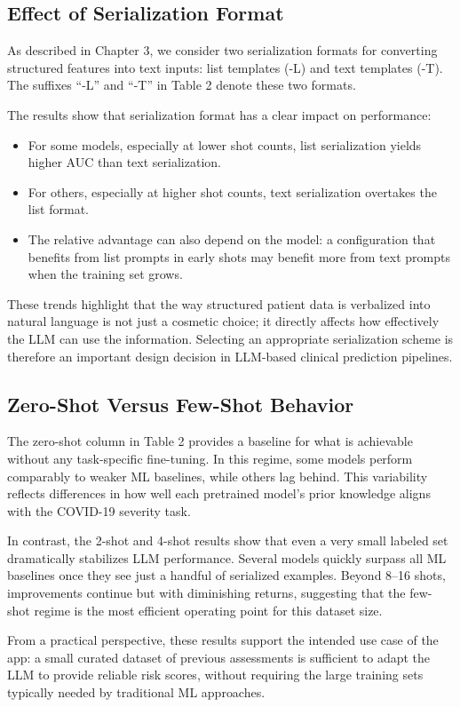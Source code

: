 \subsection{Effect of Serialization Format}
As described in Chapter 3, we consider two serialization formats for converting structured features into text inputs: list templates (-L) and text templates (-T). The suffixes ``-L'' and ``-T'' in Table 2 denote these two formats.

The results show that serialization format has a clear impact on performance:
\begin{itemize}
    \item For some models, especially at lower shot counts, list serialization yields higher AUC than text serialization.
    \item For others, especially at higher shot counts, text serialization overtakes the list format.
    \item The relative advantage can also depend on the model: a configuration that benefits from list prompts in early shots may benefit more from text prompts when the training set grows.
\end{itemize}
These trends highlight that the way structured patient data is verbalized into natural language is not just a cosmetic choice; it directly affects how effectively the LLM can use the information. Selecting an appropriate serialization scheme is therefore an important design decision in LLM-based clinical prediction pipelines.

\subsection{Zero-Shot Versus Few-Shot Behavior}
The zero-shot column in Table 2 provides a baseline for what is achievable without any task-specific fine-tuning. In this regime, some models perform comparably to weaker ML baselines, while others lag behind. This variability reflects differences in how well each pretrained model's prior knowledge aligns with the COVID-19 severity task.

In contrast, the 2-shot and 4-shot results show that even a very small labeled set dramatically stabilizes LLM performance. Several models quickly surpass all ML baselines once they see just a handful of serialized examples. Beyond 8--16 shots, improvements continue but with diminishing returns, suggesting that the few-shot regime is the most efficient operating point for this dataset size.

From a practical perspective, these results support the intended use case of the app: a small curated dataset of previous assessments is sufficient to adapt the LLM to provide reliable risk scores, without requiring the large training sets typically needed by traditional ML approaches.

